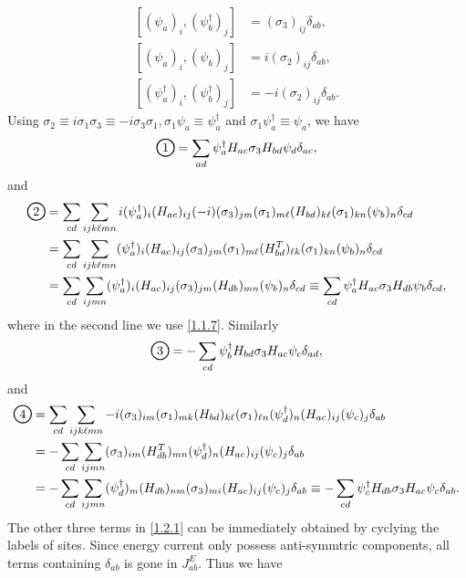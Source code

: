 \documentclass[10pt,nofootinbib]{revtex4}
\newcommand*\circled[1]{\tikz[baseline=(char.base)]{
            \node[shape=circle,draw,inner sep=2pt,thick] (char) {#1};}}
\begin{document}
		\begin{subequations}
			\begin{align}
				[(\psi_a)_i,(\psi_b^\dagger)_j]&=(\sigma_3)_{ij}\delta_{ab},\label{1.2.2a}\\
				[(\psi_a)_i,(\psi_b)_j]&=i(\sigma_2)_{ij}\delta_{ab},\label{1.2.2b}\\
				[(\psi_a^\dagger)_i,(\psi_b^\dagger)_j]&=-i(\sigma_2)_{ij}\delta_{ab}.\label{1.2.2c}
			\end{align}
		\end{subequations}
		Using $\sigma_2\equiv i\sigma_1\sigma_3\equiv-i\sigma_3\sigma_1, \sigma_1\psi_a\equiv \psi_a^\dagger$ and $\sigma_1\psi_a^\dagger\equiv\psi_a$, we have
		\begin{equation*}\label{1.2.3}
			\circled{1}=\sum_{ad}\psi_a^\dagger H_{ac}\sigma_3 H_{bd}\psi_d\delta_{ac},
		\end{equation*}
		and
		\begin{align*}
			\circled{2}&=\sum_{cd}\sum_{ijk\ell mn}i(\psi_a^\dagger)_i(H_{ac})_{ij}(-i)(\sigma_3)_{jm}(\sigma_1)_{m\ell}(H_{bd})_{k\ell}(\sigma_1)_{kn}(\psi_b)_n\delta_{cd}\\
			&=\sum_{cd}\sum_{ijk\ell mn}(\psi_a^\dagger)_i(H_{ac})_{ij}(\sigma_3)_{jm}(\sigma_1)_{m\ell}(H_{bd}^T)_{\ell k}(\sigma_1)_{kn}(\psi_b)_n\delta_{cd}\\
			&=\sum_{cd}\sum_{ijmn}(\psi_a^\dagger)_i(H_{ac})_{ij}(\sigma_3)_{jm}(H_{db})_{mn}(\psi_b)_n\delta_{cd}\equiv\sum_{cd}\psi_a^\dagger H_{ac}\sigma_3 H_{db}\psi_b\delta_{cd},
		\end{align*}
		where in the second line we use \eqref{1.1.7}. Similarly
		\begin{equation*}
			\circled{3}=-\sum_{cd}\psi_b^\dagger H_{bd}\sigma_3 H_{ac}\psi_c\delta_{ad},
		\end{equation*}
		and
		\begin{align*}
			\circled{4}&=\sum_{cd}\sum_{ijk\ell mn}-i(\sigma_3)_{im}(\sigma_1)_{mk}(H_{bd})_{k\ell}(\sigma_1)_{\ell n}(\psi_d^\dagger)_n(H_{ac})_{ij}(\psi_c)_j\delta_{ab}\\
			&=-\sum_{cd}\sum_{ijmn}(\sigma_3)_{im}(H_{db}^T)_{mn}(\psi_d^\dagger)_n(H_{ac})_{ij}(\psi_c)_j\delta_{ab}\\
			&=-\sum_{cd}\sum_{ijmn}(\psi_d^\dagger)_m(H_{db})_{nm}(\sigma_3)_{mi}(H_{ac})_{ij}(\psi_c)_j\delta_{ab}\equiv-\sum_{cd}\psi_c^\dagger H_{db}\sigma_3 H_{ac}\psi_c\delta_{ab}.
		\end{align*}
		\indent The other three terms in \eqref{1.2.1} can be immediately obtained by cyclying the labels of sites. Since energy current only possess anti-symmtric components, all terms containing $\delta_{ab}$ is gone in $J_{ab}^E$. Thus we have
\end{document}
